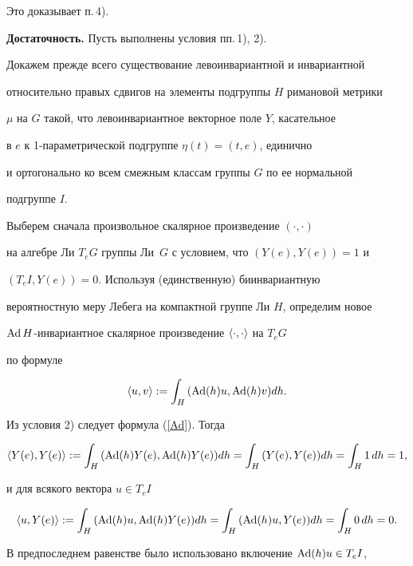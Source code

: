 \begin{pf}
Это доказывает п.\,4).


\smallskip





{\bf Достаточность.} Пусть выполнены условия пп.\,1), 2).





Докажем прежде всего существование левоинвариантной и инвариантной


относительно правых сдвигов на элементы подгруппы $H$ римановой метрики


$\mu$ на $G$ такой, что левоинвариантное векторное поле $Y$, касательное


в $e$ к 1-параметрической подгруппе $\eta(t)=(t,e)$, единично


и ортогонально ко всем смежным классам группы $G$ по ее нормальной


подгруппе $I$.





Выберем сначала произвольное скалярное произведение $(\cdot,\cdot)$


на алгебре Ли $T_{e}G$ группы Ли~$G$ с условием, что $(Y(e),Y(e))=1$ и


$(T_{e}I,Y(e))=0$. Используя (единственную) биинвариантную


вероятностную меру Лебега на компактной группе Ли $H$, определим новое


$\operatorname{Ad} H$-ин\-ва\-ри\-ант\-ное скалярное произведение $\langle\cdot,\cdot\rangle$ на $T_{e}G$


по формуле


$$


\la u,v\ra:=\int_{H}{(\Ad(h)u,\Ad(h)v)dh}.


$$


Из условия 2) следует формула (\ref{Ad}). Тогда


$$


\la Y(e),Y(e)\ra:=\int_{H}{(\Ad(h)Y(e),\Ad(h)Y(e))dh}=


\int_{H}{(Y(e),Y(e))dh}=\int_{H}{1\,dh}= 1,


$$


и для всякого вектора $u\in T_{e}I$


$$


\la u,Y(e)\ra:=\int_{H}{(\Ad(h)u,\Ad(h)Y(e))dh}


=\int_{H}{(\Ad(h)u,Y(e))dh}=\int_{H}{0\,dh}=0.


$$


В предпоследнем равенстве было использовано включение $\operatorname{Ad}(h)u\in T_{e}I$,



\end{pf}
